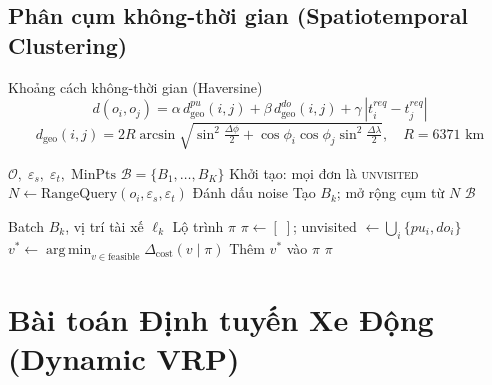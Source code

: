 \documentclass[12pt,a4paper]{article}
\DeclareMathOperator{\argmin}{arg\,min}
\begin{document}
\subsection{Phân cụm không-thời gian (Spatiotemporal Clustering)}

\begin{formulabox}{Khoảng cách không-thời gian (Haversine)}
\begin{equation}
  d(o_i,o_j)
  = \alpha\,d_{\text{geo}}^{pu}(i,j)
  + \beta\,d_{\text{geo}}^{do}(i,j)
  + \gamma\,|t_i^{req}-t_j^{req}|
\end{equation}
\begin{equation}
  d_{\text{geo}}(i,j)
  = 2R\arcsin\sqrt{\sin^2\!\tfrac{\Delta\phi}{2}
    + \cos\phi_i\cos\phi_j\sin^2\!\tfrac{\Delta\lambda}{2}},\quad R = 6371\text{ km}
\end{equation}
\end{formulabox}

\begin{algorithm}[H]
\caption{ST-DBSCAN cho Ghép đơn cùng tuyến}
\begin{algorithmic}[1]
\Require $\mathcal{O},\;\varepsilon_s,\;\varepsilon_t,\;\mathrm{MinPts}$
\Ensure  $\mathcal{B}=\{B_1,\ldots,B_K\}$
\State Khởi tạo: mọi đơn là \textsc{unvisited}
    \State $N\leftarrow\mathrm{RangeQuery}(o_i,\varepsilon_s,\varepsilon_t)$
     Đánh dấu noise
    \Else\; Tạo $B_k$; mở rộng cụm từ $N$ \EndIf
  \EndIf
\EndFor
\State \Return $\mathcal{B}$
\end{algorithmic}
\end{algorithm}

\begin{algorithm}[H]
\caption{Greedy Insertion --- thứ tự Pickup-Delivery}
\begin{algorithmic}[1]
\Require Batch $B_k$, vị trí tài xế $\ell_k$
\Ensure  Lộ trình $\pi$
\State $\pi\leftarrow[\;]$; unvisited $\leftarrow\bigcup_i\{pu_i,do_i\}$
  \State $v^*\leftarrow\argmin_{v\in\mathrm{feasible}}\Delta_{\mathrm{cost}}(v\mid\pi)$
  \State Thêm $v^*$ vào $\pi$
\EndWhile
\State \Return $\pi$
\end{algorithmic}
\end{algorithm}

\section{Bài toán Định tuyến Xe Động (Dynamic VRP)}
\end{document}
